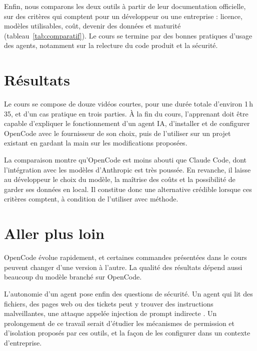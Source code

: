 \documentclass[11pt,a4paper]{article}
\begin{document}
Enfin, nous comparons les deux outils à partir de leur documentation officielle, sur des critères qui comptent pour un développeur ou une entreprise : licence, modèles utilisables, coût, devenir des données et maturité (tableau~\ref{tab:comparatif}). Le cours se termine par des bonnes pratiques d'usage des agents, notamment sur la relecture du code produit et la sécurité.

\section*{Résultats}

Le cours se compose de douze vidéos courtes, pour une durée totale d'environ 1\,h\,35, et d'un cas pratique en trois parties. À la fin du cours, l'apprenant doit être capable d'expliquer le fonctionnement d'un agent IA, d'installer et de configurer OpenCode avec le fournisseur de son choix, puis de l'utiliser sur un projet existant en gardant la main sur les modifications proposées.

La comparaison montre qu'OpenCode est moins abouti que Claude Code, dont l'intégration avec les modèles d'Anthropic est très poussée. En revanche, il laisse au développeur le choix du modèle, la maîtrise des coûts et la possibilité de garder ses données en local. Il constitue donc une alternative crédible lorsque ces critères comptent, à condition de l'utiliser avec méthode.

\section*{Aller plus loin}

OpenCode évolue rapidement, et certaines commandes présentées dans le cours peuvent changer d'une version à l'autre. La qualité des résultats dépend aussi beaucoup du modèle branché sur OpenCode.

L'autonomie d'un agent pose enfin des questions de sécurité. Un agent qui lit des fichiers, des pages web ou des tickets peut y trouver des instructions malveillantes, une attaque appelée injection de prompt indirecte \citep{greshake2023}. Un prolongement de ce travail serait d'étudier les mécanismes de permission et d'isolation proposés par ces outils, et la façon de les configurer dans un contexte d'entreprise.
\end{document}
